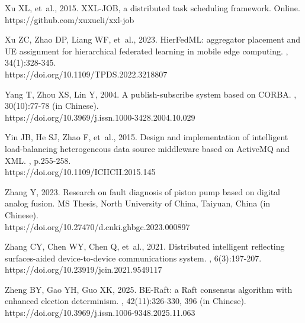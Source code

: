 \begin{thebibliography}{}
Xu XL, {et~al.}, 2015.
\newblock XXL-JOB, a distributed task scheduling framework.
\newblock Online. https://github.com/xuxueli/xxl-job

Xu ZC, Zhao DP, Liang WF, {et~al.}, 2023.
\newblock HierFedML: aggregator placement and UE assignment for hierarchical federated learning in mobile edge computing.
, 34(1):328-345. \\
https://doi.org/10.1109/TPDS.2022.3218807

Yang T, Zhou XS, Lin Y, 2004.
\newblock A publish-subscribe system based on CORBA.
, 30(10):77-78 (in Chinese). \\
https://doi.org/10.3969/j.issn.1000-3428.2004.10.029

Yin JB, He SJ, Zhao F, {et~al.}, 2015.
\newblock Design and implementation of intelligent load-balancing heterogeneous data source middleware based on ActiveMQ and XML.
, p.255-258. \\
https://doi.org/10.1109/ICIICII.2015.145

Zhang Y, 2023.
\newblock Research on fault diagnosis of piston pump based on digital analog fusion.
\newblock MS Thesis, North University of China, Taiyuan, China (in Chinese). \\
https://doi.org/10.27470/d.cnki.ghbgc.2023.000897

Zhang CY, Chen WY, Chen Q, {et~al.}, 2021.
\newblock Distributed intelligent reflecting surfaces-aided device-to-device communications system.
, 6(3):197-207. \\
https://doi.org/10.23919/jcin.2021.9549117

Zheng BY, Gao YH, Guo XK, 2025.
\newblock BE-Raft: a Raft consensus algorithm with enhanced election determinism.
, 42(11):326-330, 396 (in Chinese). \\
https://doi.org/10.3969/j.issn.1006-9348.2025.11.063

\end{thebibliography}
